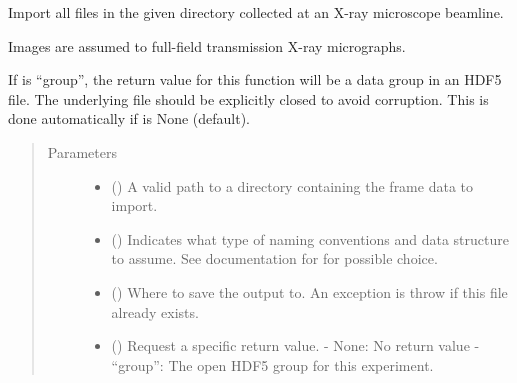 \documentclass[letterpaper,10pt,english]{sphinxmanual}
\begin{document}
\begin{fulllineitems}
\label{\detokenize{xanespy:xanespy.importers.import_frameset}}
Import all files in the given directory collected at an X-ray
microscope beamline.

Images are assumed to full-field transmission X-ray micrographs.

If  is “group”, the return value for this function
will be a data group in an  HDF5 file. The underlying file
should be explicitly closed to avoid corruption. This is done
automatically if  is None (default).
\begin{quote}\begin{description}
\item[{Parameters}] \leavevmode\begin{itemize}
\item {} 
 () \textendash{} A valid path to a directory containing the frame data to import.

\item {} 
 () \textendash{} Indicates what type of naming conventions and data structure to
assume. See documentation for  for
possible choice.

\item {} 
 () \textendash{} Where to save the output to. An exception is throw if this file
already exists.

\item {} 
 () \textendash{} Request a specific return value.
- None: No return value
- “group”: The open HDF5 group for this experiment.

\end{itemize}

\end{description}\end{quote}

\end{fulllineitems}

\end{document}
